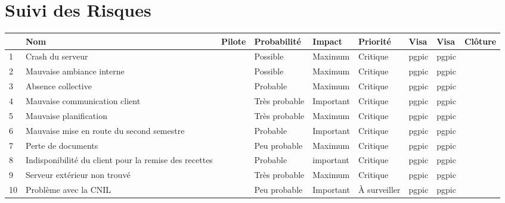 \documentclass[asi]{picInsa}
\title{\PRO{}}
\author{\Pierre}
\begin{document}
\couverture{}

\informationsGenerales{}


\chapter*{Suivi des Risques}
\begin{longtable}{|p{0.3cm}|p{2.5cm}|p{2cm}|p{2cm}|p{1.8cm}|p{1.5cm}|p{1cm}|p{1cm}|p{1.5cm}|}
			\hline
			\rowcolor{gray!40}
			\No & Nom & Pilote & Probabilité & Impact & Priorité & Visa \RQCourt{} & Visa \CPCourt{} & Clôture \\\hline
			
			 1 & Crash du serveur & \Matthieu & Possible & Maximum & Critique & pgpic & pgpic & \\\hline
			 
			 2 & Mauvaise ambiance interne & \Michel & Possible & Maximum & Critique & pgpic & pgpic & \\\hline
			 
			 3 & Absence collective & \Pierre & Probable & Maximum & Critique & pgpic & pgpic & \\\hline
			 
			 4 & Mauvaise communication client & \Julie & Très probable & Important & Critique & pgpic & pgpic & \\\hline
			 
			 5 & Mauvaise planification & \Florian & Très probable & Maximum & Critique & pgpic & pgpic & \\\hline
			 
			 6 & Mauvaise mise en route du second semestre & \Melissa & Probable & Important & Critique & pgpic & pgpic & \\\hline
			 
			 7 & Perte de documents & \Mathieu & Peu probable & Maximum & Critique & pgpic & pgpic & \\\hline
			 
			 8 & Indisponibilité du client pour la remise des recettes & \Julie & Probable & important & Critique & pgpic & pgpic & \\\hline
			 
			 9 & Serveur extérieur non trouvé & \Matthieu & Très probable & Maximum & Critique & pgpic & pgpic & \\\hline
			 
			 10 & Problème avec la CNIL & \Pierre & Peu probable & Important & À surveiller & pgpic & pgpic & \\\hline
			 

\end{longtable}
\end{document}
